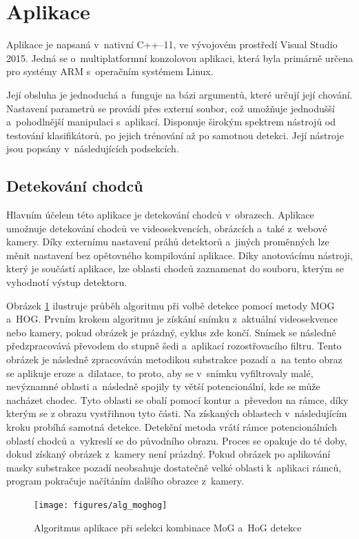 \section{Aplikace}
Aplikace je napsaná v~nativní C++--11, ve vývojovém prostředí Visual Studio 2015. Jedná se o~multiplatformní konzolovou aplikaci, která byla primárně určena pro systémy ARM s~operačním systémem Linux. 

Její obsluha je jednoduchá a~funguje na bázi argumentů, které určují její chování. Nastavení parametrů se provádí přes externí soubor, což umožňuje jednodušší a~pohodlnější manipulaci s~aplikací. Disponuje širokým spektrem nástrojů od testování klasifikátorů, po jejich trénování až po samotnou detekci. Její nástroje jsou popsány v~následujících podsekcích.

\subsection{Detekování chodců}
Hlavním účelem této aplikace je detekování chodců v~obrazech. Aplikace umožnuje detekování chodců ve videosekvencích, obrázcích a~také z~webové kamery. Díky externímu nastavení práhů detektorů a~jiných proměnných lze měnit nastavení bez opětovného kompilování aplikace. Díky anotovácímu nástroji, který je součástí aplikace, lze oblasti chodců zaznamenat do souboru, kterým se vyhodnotí výstup detektoru.
 
Obrázek \ref{mog_algorithm} ilustruje průběh algoritmu při volbě detekce pomocí metody MOG a~HOG. Prvním krokem algoritmu je získání snímku z~aktuální videosekvence nebo kamery, pokud obrázek je prázdný, cyklus zde končí. Snímek se následně předzpracovává převodem do stupně šedi a~aplikací rozostřovacího filtru. Tento obrázek je následně zpracováván metodikou substrakce pozadí a~na tento obraz se aplikuje eroze a~dilatace, to proto, aby se v~snímku vyfiltrovaly malé, nevýznamné oblasti a~následně spojily ty větší potencionální, kde se může nacházet chodec. Tyto oblasti se obalí pomocí kontur a~převedou na rámce, díky kterým se z obrazu vystřihnou tyto části. Na získaných oblastech v~následujícím kroku probíhá samotná detekce. Detekční metoda vrátí rámce potencionálních oblastí chodců a~vykreslí se do původního obrazu. Proces se opakuje do té doby, dokud získaný obrázek z~kamery není prázdný. Pokud obrázek po aplikování masky substrakce pozadí neobsahuje dostatečně velké oblasti k~aplikaci rámců, program pokračuje načítáním dalšího obrazce z~kamery.  

\begin{figure}[H]
\centering
\texttt{[image: figures/alg\_moghog]}
\caption{Algoritmus aplikace při selekci kombinace MoG a~HoG detekce}
\label{mog_algorithm}
\end{figure}

